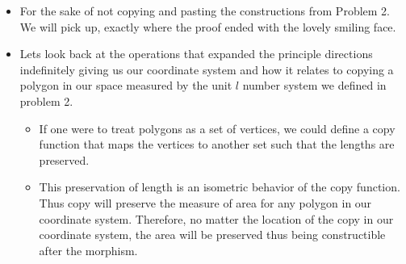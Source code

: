 \documentclass[]{report}
\begin{document}
\begin{itemize}
	\item For the sake of not copying and pasting the constructions from Problem 2. We will pick up, exactly where the proof ended with the lovely smiling face.
	
	\item  Lets look back at the operations that expanded the principle directions indefinitely giving us  our coordinate system and how it relates to copying a polygon in our space measured by the unit $l$ number system we defined in problem 2.  
	
		\begin{itemize}
			\item If one were to treat polygons as a set of vertices, we could define a copy function that maps the vertices to another set such that the lengths are preserved.  
			
			\item This preservation of length is an isometric behavior of the copy function.  Thus copy will preserve the measure of area for any polygon in our coordinate system.  Therefore, no matter the location of the copy in our coordinate system, the area will be preserved thus being constructible after the morphism.
		\end{itemize}
	 
\end{itemize}
	
		\begin{flushright}
		\smiley{}
	\end{flushright}
	
	
\end{document}
